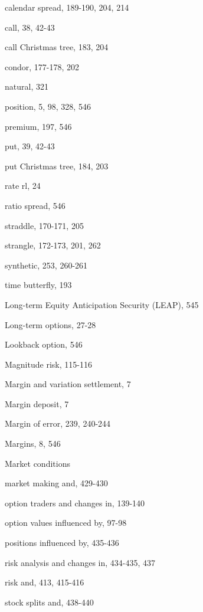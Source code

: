 \noindent calendar spread, 189-190, 204, 214\par
\noindent call, 38, 42-43\par
\noindent call Christmas tree, 183, 204\par
\noindent condor, 177-178, 202\par
\noindent natural, 321\par
\noindent position, 5, 98, 328, 546\par
\noindent premium, 197, 546\par
\noindent put, 39, 42-43\par
\noindent put Christmas tree, 184, 203\par
\noindent rate rl, 24\par
\noindent ratio spread, 546\par
\noindent straddle, 170-171, 205\par
\noindent strangle, 172-173, 201, 262\par
\noindent synthetic, 253, 260-261\par
\noindent time butterfly, 193\par
\noindent Long-term Equity Anticipation Security (LEAP), 545\par
\noindent Long-term options, 27-28\par
\noindent Lookback option, 546\par
\noindent Magnitude risk, 115-116\par
\noindent Margin and variation settlement, 7\par
\noindent Margin deposit, 7\par
\noindent Margin of error, 239, 240-244\par
\noindent Margins, 8, 546\par
\noindent Market conditions\par
\noindent market making and, 429-430\par
\noindent option traders and changes in, 139-140\par
\noindent option values influenced by, 97-98\par
\noindent positions influenced by, 435-436\par
\noindent risk analysis and changes in, 434-435, 437\par
\noindent risk and, 413, 415-416\par
\noindent stock splits and, 438-440\par

